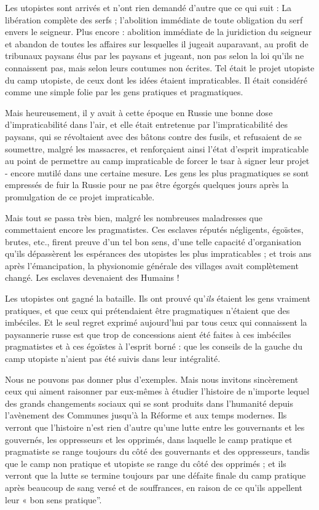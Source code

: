 Les utopistes sont arrivés et n'ont rien demandé d'autre que ce qui suit : La libération complète des serfs ; l'abolition immédiate de toute obligation du serf envers le seigneur. Plus encore : abolition immédiate de la juridiction du seigneur et abandon de toutes les affaires sur lesquelles il jugeait auparavant, au profit de tribunaux paysans élus par les paysans et jugeant, non pas selon la loi qu'ils ne connaissent pas, mais selon leurs coutumes non écrites. Tel était le projet utopiste du camp utopiste, de ceux dont les idées étaient impraticables. Il était considéré comme une simple folie par les gens pratiques et pragmatiques.

Mais heureusement, il y avait à cette époque en Russie une bonne dose d'impraticabilité dans l'air, et elle était entretenue par l'impraticabilité des paysans, qui se révoltaient avec des bâtons contre des fusils, et refusaient de se soumettre, malgré les massacres, et renforçaient ainsi l'état d'esprit impraticable au point de permettre au camp impraticable de forcer le tsar à signer leur projet - encore mutilé dans une certaine mesure. Les gens les plus pragmatiques se sont empressés de fuir la Russie pour ne pas être égorgés quelques jours après la promulgation de ce projet impraticable.

Mais tout se passa très bien, malgré les nombreuses maladresses que commettaient encore les pragmatistes. Ces esclaves réputés négligents, égoïstes, brutes, etc., firent preuve d'un tel bon sens, d'une telle capacité d'organisation qu'ils dépassèrent les espérances des utopistes les plus impraticables ; et trois ans après l'émancipation, la physionomie générale des villages avait complètement changé. Les esclaves devenaient des Humains !

Les utopistes ont gagné la bataille. Ils ont prouvé qu'\emph{ils} étaient les gens vraiment pratiques, et que ceux qui prétendaient être pragmatiques n’étaient que des imbéciles. Et le seul regret exprimé aujourd'hui par tous ceux qui connaissent la paysannerie russe est que trop de concessions aient été faites à ces imbéciles pragmatistes et à ces égoïstes à l’esprit borné : que les conseils de la gauche du camp utopiste n'aient pas été suivis dans leur intégralité.

Nous ne pouvons pas donner plus d'exemples. Mais nous invitons sincèrement ceux qui aiment raisonner par eux-mêmes à étudier l'histoire de n'importe lequel des grands changements sociaux qui se sont produits dans l'humanité depuis l'avènement des Communes jusqu'à la Réforme et aux temps modernes. Ils verront que l'histoire n'est rien d'autre qu'une lutte entre les gouvernants et les gouvernés, les oppresseurs et les opprimés, dans laquelle le camp pratique et pragmatiste se range toujours du côté des gouvernants et des oppresseurs, tandis que le camp non pratique et utopiste se range du côté des opprimés ; et ils verront que la lutte se termine toujours par une défaite finale du camp pratique après beaucoup de sang versé et de souffrances, en raison de ce qu'ils appellent leur « bon sens pratique''.

